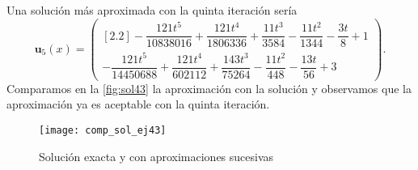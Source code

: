 \begin{ejemplo}
\begin{equation}
	\end{equation}
	Una solución más aproximada con la quinta iteración sería
	\begin{equation}
		\textbf{u}_{5}(x) = \begin{pmatrix}[2.2]	-\dfrac{121t^5}{10838016}+\dfrac{121t^4}{1806336}+\dfrac{11t^3}{3584}-\dfrac{11t^2}{1344}-\dfrac{3t}{8}+1 \\ -\dfrac{121t^5}{14450688}+\dfrac{121t^4}{602112}+\dfrac{143t^3}{75264}-\dfrac{11t^2}{448}-\dfrac{13t}{56}+3	\end{pmatrix}.
	\end{equation}
	Comparamos en la \autoref{fig:sol43} la aproximación con la solución y observamos que la aproximación ya es aceptable con la quinta iteración.
	\begin{figure}[h!]
		\centering
		\texttt{[image: comp\_sol\_ej43]}
		\caption{Solución exacta y con aproximaciones sucesivas}
		\label{fig:sol43}
	\end{figure}
\end{ejemplo}


\endinput
